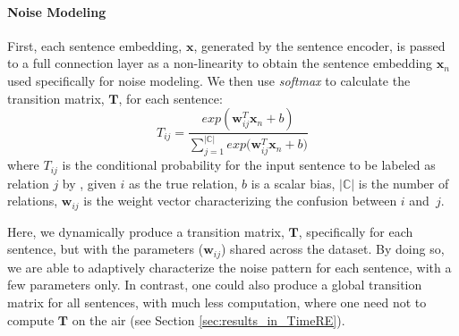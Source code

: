 \paragraph{Noise Modeling}
%
First, each sentence embedding, $\mathbf{x}$,
generated by the sentence encoder, is passed to a full connection layer as a  non-linearity to obtain the
sentence embedding $\mathbf{x}_n$ used specifically for noise modeling.
We then use \emph{softmax} to calculate the transition matrix, $\mathbf{T}$, for each sentence:
%
\begin{equation}\label{eq_tm}
T_{ij} = \frac{exp({\mathbf{w}_{ij}^T \mathbf{x}_n + b})}{\sum_{j=1}^{|\mathbb{C}|}{exp({\mathbf{w}_{ij}^T \mathbf{x}_n + b}})}
\end{equation}
where $T_{ij}$ is the conditional probability for the input sentence to be labeled as relation $j$ by \DS, given $i$ as the true relation, $b$ is a scalar bias,  $|\mathbb{C}|$ is the number of relations, $\mathbf{w}_{ij}$ is the weight vector characterizing the confusion between $i$ and~$j$. %

Here, we dynamically produce a transition matrix, $\mathbf{T}$, specifically for each sentence, but with the parameters ($\mathbf{w}_{ij}$) shared across the dataset. By doing so, we are able to adaptively characterize the noise pattern for each sentence, with a few parameters only. In contrast, one could also produce a global transition matrix for all sentences, with much less computation, where one need not to compute $\mathbf{T}$ on the air (see Section \ref{sec:results_in_TimeRE}).


